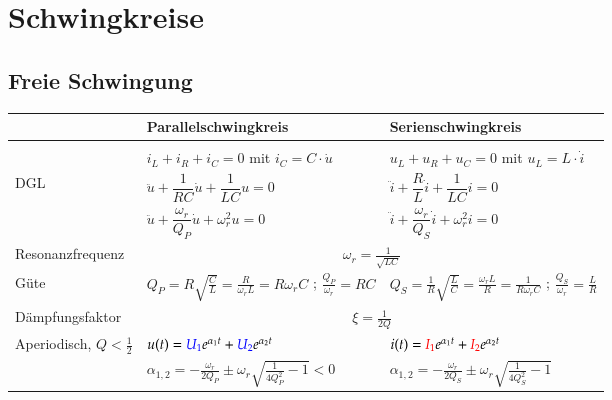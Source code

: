 \section{Schwingkreise}
\subsection{Freie Schwingung}
\renewcommand{\arraystretch}{1.9}
\begin{tabular}{| p{3.5cm} | p{7.5cm} | p{7cm} |}
	\hline
		& \textbf{Parallelschwingkreis} 
		& \textbf{Serienschwingkreis} \\
	\hline
	& 
	& \\
	& $i_L + i_R + i_C = 0$ \hspace{0.3cm} mit $i_C = C\cdot\dot{u}$
	& $u_L + u_R + u_C = 0$ \hspace{0.3cm} mit $u_L = L\cdot\dot{i}$\\
	\hline	
	DGL &
  $\ddot{u} + \dfrac{1}{RC} \dot{u} + \dfrac{1}{LC} u = 0$
  & $\ddot{i} + \dfrac{R}{L} \dot{i} + \dfrac{1}{LC} i = 0$\\
  & $\ddot{u} + \dfrac{\omega_r}{Q_P} \dot{u} + \omega_r^2 u = 0$
  & $\ddot{i} + \dfrac{\omega_r}{Q_S} \dot{i} + \omega_r^2 i = 0$\\
	\hline
	Resonanzfrequenz & \multicolumn{2}{c|}{$\omega_r =
	\frac{1}{\sqrt{LC}}$} \\
	\hline
	Güte & 
	$Q_P = R\sqrt{\frac{C}{L}} = \frac{R}{\omega_r L}=R\omega_rC$ ; \hspace{0.5cm} $\frac{Q_P}{\omega_r}=RC$ &
	$Q_S = \frac{1}{R}\sqrt{\frac{L}{C}} = \frac{\omega_r
	L}{R}=\frac{1}{R\omega_rC}$ ; \hspace{0.5cm} $\frac{Q_S}{\omega_r}=\frac{L}{R}$\\
	\hline
	Dämpfungsfaktor & \multicolumn{2}{c|}{$\xi=\frac{1}{2Q}$} \\
	\hline
	Aperiodisch, $ Q < \frac{1}{2}$
		& $u(t) = \textcolor{blue}{U_1} e^{\alpha_1 t} + \textcolor{blue}{U_2} e^{\alpha_2 t}$ 
		& $i(t) = \textcolor{red}{I_1} e^{\alpha_1 t} + \textcolor{red}{I_2} e^{\alpha_2 t}$ \\
	\centering{$\alpha_1,\alpha_2$ reel}	
		& $\alpha_{1,2} = - \frac{\omega_r}{2 Q_P} \pm \omega_r \sqrt{\frac{1}{4 Q_P^2} - 1} <0$	
		& $\alpha_{1,2} = - \frac{\omega_r}{2 Q_S} \pm \omega_r \sqrt{\frac{1}{4Q_S^2} - 1}$
		\vspace{0.1cm}
		\\
	\hline 	

\end{tabular}
